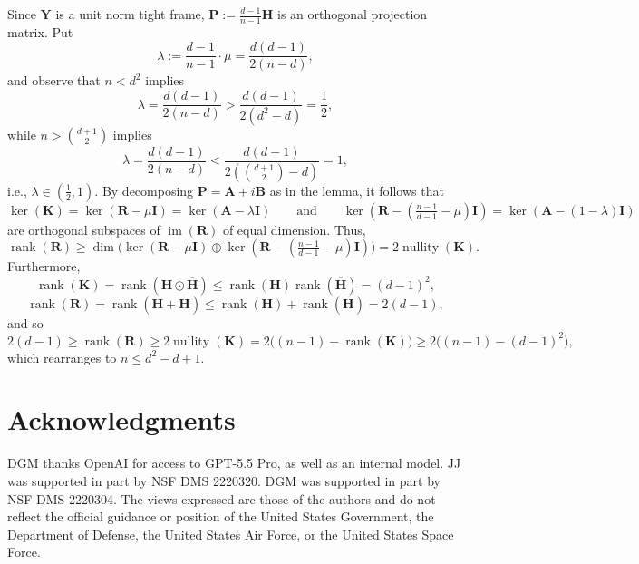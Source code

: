 \documentclass{article}
\theoremstyle{plain}
\theoremstyle{definition}
\begin{document}
Since $\boldsymbol{Y}$ is a unit norm tight frame, $\boldsymbol{P}:=\frac{d-1}{n-1}\boldsymbol{H}$ is an orthogonal projection matrix.
Put
\[
\lambda
:=\frac{d-1}{n-1}\cdot\mu
=\frac{d(d-1)}{2(n-d)},
\]
and observe that $n<d^2$ implies
\[
\lambda
=\frac{d(d-1)}{2(n-d)}
>\frac{d(d-1)}{2(d^2-d)}
=\frac{1}{2},
\]
while $n>\binom{d+1}{2}$ implies
\[
\lambda
=\frac{d(d-1)}{2(n-d)}
<\frac{d(d-1)}{2(\binom{d+1}{2}-d)}
=1,
\]
i.e., $\lambda\in(\frac{1}{2},1)$.
By decomposing $\boldsymbol{P}=\boldsymbol{A}+i\boldsymbol{B}$ as in the lemma, it follows that
\[
\operatorname{ker}(\boldsymbol{K})
=\operatorname{ker}(\boldsymbol{R}-\mu\boldsymbol{I})
=\operatorname{ker}(\boldsymbol{A}-\lambda\boldsymbol{I})
\qquad
\text{and}
\qquad
\operatorname{ker}(\boldsymbol{R}-(\tfrac{n-1}{d-1}-\mu)\boldsymbol{I})
=\operatorname{ker}(\boldsymbol{A}-(1-\lambda)\boldsymbol{I})
\]
are orthogonal subspaces of $\operatorname{im}(\boldsymbol{R})$ of equal dimension.
Thus,
\[
\operatorname{rank}(\boldsymbol{R})
\geq\operatorname{dim}\Big(\operatorname{ker}(\boldsymbol{R}-\mu\boldsymbol{I})\oplus\operatorname{ker}(\boldsymbol{R}-(\tfrac{n-1}{d-1}-\mu)\boldsymbol{I})\Big)
=2\operatorname{nullity}(\boldsymbol{K}).
\]
Furthermore,
\[
\operatorname{rank}(\boldsymbol{K})
=\operatorname{rank}(\boldsymbol{H}\odot\overline{\boldsymbol{H}})
\leq\operatorname{rank}(\boldsymbol{H})\operatorname{rank}(\overline{\boldsymbol{H}})
=(d-1)^2,
\]
\[
\operatorname{rank}(\boldsymbol{R})
=\operatorname{rank}(\boldsymbol{H}+\overline{\boldsymbol{H}})
\leq\operatorname{rank}(\boldsymbol{H})+\operatorname{rank}(\overline{\boldsymbol{H}})
=2(d-1),
\]
and so
\[
2(d-1)
\geq\operatorname{rank}(\boldsymbol{R})
\geq2\operatorname{nullity}(\boldsymbol{K})
=2\big((n-1)-\operatorname{rank}(\boldsymbol{K})\big)
\geq2\big((n-1)-(d-1)^2\big),
\]
which rearranges to $n\leq d^2-d+1$.

\section*{Acknowledgments}

DGM thanks OpenAI for access to GPT-5.5 Pro, as well as an internal model.
JJ was supported in part by NSF DMS 2220320.
DGM was supported in part by NSF DMS 2220304.
The views expressed are those of the authors and do not reflect the official guidance or position of the United States Government, the Department of Defense, the United States Air Force, or the United States Space Force.
\end{document}
